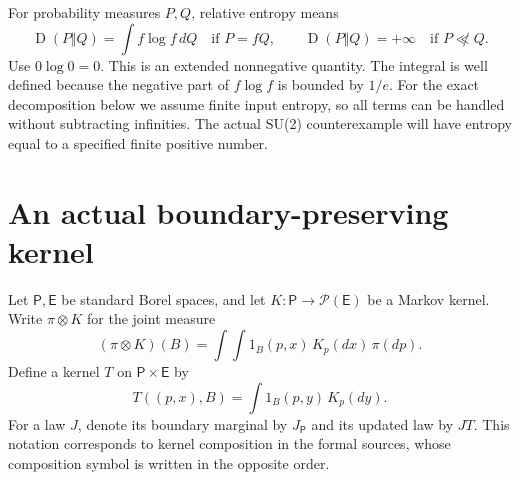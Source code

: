 \documentclass[11pt]{article}
\newcommand{\KL}{\operatorname{D}}
\begin{document}
For probability measures $P,Q$, relative entropy means
\[
 \KL(P\Vert Q)=\int f\log f\,dQ\quad\text{if }P=fQ,
 \qquad \KL(P\Vert Q)=+\infty\quad\text{if }P\not\ll Q.
\]
Use $0\log0=0$. This is an extended nonnegative quantity. The integral is
well defined because the negative part of $f\log f$ is bounded by $1/e$.
For the exact decomposition below we assume finite input entropy, so all
terms can be handled without subtracting infinities. The actual SU(2)
counterexample will have entropy equal to a specified finite positive number.

\section{An actual boundary-preserving kernel}
Let $\mathsf P,\mathsf E$ be standard Borel spaces, and let
$K:\mathsf P\to\mathcal P(\mathsf E)$ be a Markov kernel. Write
$\pi\otimes K$ for the joint measure
\[
 (\pi\otimes K)(B)=\int\!\int1_B(p,x)\,K_p(dx)\,\pi(dp).
\]
Define a kernel $T$ on $\mathsf P\times\mathsf E$ by
\begin{equation}\label{eq:T}
 T((p,x),B)=\int1_B(p,y)\,K_p(dy).
\end{equation}
For a law $J$, denote its boundary marginal by $J_{\mathsf P}$ and its
updated law by $JT$. This notation corresponds to kernel composition in the
formal sources, whose composition symbol is written in the opposite order.
\end{document}
